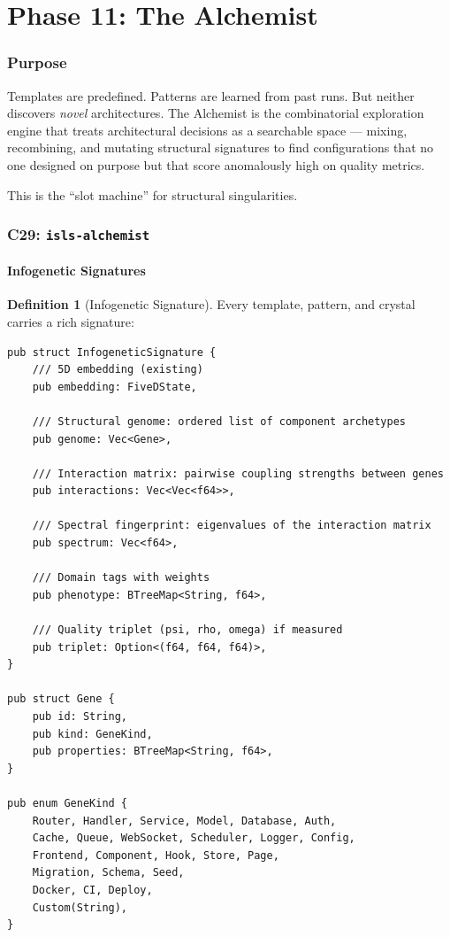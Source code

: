 \documentclass[11pt,a4paper,twoside]{article}
\theoremstyle{definition}
\newtheorem{definition}{Definition}[section]
\theoremstyle{plain}
\theoremstyle{remark}
\begin{document}
\part{Phase 11: The Alchemist}\label{part:alchemist}

\section{Purpose}\label{sec:al:purpose}

Templates are predefined. Patterns are learned from past runs. But
neither discovers \emph{novel} architectures. The Alchemist is the
combinatorial exploration engine that treats architectural decisions
as a searchable space --- mixing, recombining, and mutating structural
signatures to find configurations that no one designed on purpose but
that score anomalously high on quality metrics.

This is the ``slot machine'' for structural singularities.


\section{C29: \texttt{isls-alchemist}}\label{sec:al:crate}

\subsection{Infogenetic Signatures}\label{sec:al:sig}

\begin{definition}[Infogenetic Signature]\label{def:infosig}
Every template, pattern, and crystal carries a rich signature:
\begin{lstlisting}
pub struct InfogeneticSignature {
    /// 5D embedding (existing)
    pub embedding: FiveDState,

    /// Structural genome: ordered list of component archetypes
    pub genome: Vec<Gene>,

    /// Interaction matrix: pairwise coupling strengths between genes
    pub interactions: Vec<Vec<f64>>,

    /// Spectral fingerprint: eigenvalues of the interaction matrix
    pub spectrum: Vec<f64>,

    /// Domain tags with weights
    pub phenotype: BTreeMap<String, f64>,

    /// Quality triplet (psi, rho, omega) if measured
    pub triplet: Option<(f64, f64, f64)>,
}

pub struct Gene {
    pub id: String,
    pub kind: GeneKind,
    pub properties: BTreeMap<String, f64>,
}

pub enum GeneKind {
    Router, Handler, Service, Model, Database, Auth,
    Cache, Queue, WebSocket, Scheduler, Logger, Config,
    Frontend, Component, Hook, Store, Page,
    Migration, Schema, Seed,
    Docker, CI, Deploy,
    Custom(String),
}
\end{lstlisting}
\end{definition}
\end{document}

